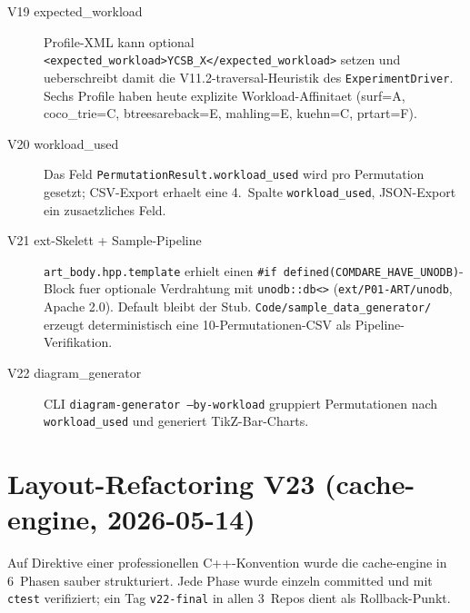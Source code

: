 \begin{description}
    \item[V19 expected\_workload] Profile-XML kann optional
          \texttt{<expected\_workload>YCSB\_X</expected\_workload>} setzen
          und ueberschreibt damit die V11.2-traversal-Heuristik des
          \texttt{ExperimentDriver}. Sechs Profile haben heute explizite
          Workload-Affinitaet (surf=A, coco\_trie=C, btreesareback=E,
          mahling=E, kuehn=C, prtart=F).
    \item[V20 workload\_used] Das Feld
          \texttt{PermutationResult.workload\_used} wird pro Permutation
          gesetzt; CSV-Export erhaelt eine 4.~Spalte
          \texttt{workload\_used}, JSON-Export ein zusaetzliches Feld.
    \item[V21 ext-Skelett + Sample-Pipeline] \texttt{art\_body.hpp.template}
          erhielt einen \texttt{\#if defined(COMDARE\_HAVE\_UNODB)}-Block
          fuer optionale Verdrahtung mit \texttt{unodb::db<>}
          (\texttt{ext/P01-ART/unodb}, Apache 2.0). Default bleibt der Stub.
          \texttt{Code/sample\_data\_generator/} erzeugt deterministisch
          eine 10-Permutationen-CSV als Pipeline-Verifikation.
    \item[V22 diagram\_generator] CLI
          \texttt{diagram-generator --by-workload} gruppiert Permutationen
          nach \texttt{workload\_used} und generiert TikZ-Bar-Charts.
\end{description}

\section{Layout-Refactoring V23 (cache-engine, 2026-05-14)}

Auf Direktive einer professionellen C++-Konvention wurde die cache-engine
in 6~Phasen sauber strukturiert. Jede Phase wurde einzeln committed und
mit \texttt{ctest} verifiziert; ein Tag \texttt{v22-final} in allen
3~Repos dient als Rollback-Punkt.

